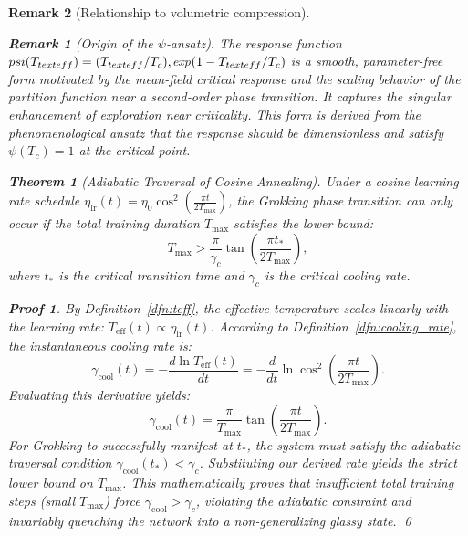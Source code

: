 \documentclass[11pt, a4paper]{article}
\newtheorem{theo}{Theorem}[section]
\theoremstyle{plain}
\newtheorem*{remark}{Remark}
\newtheorem*{pf}{Proof}
\begin{document}
\begin{remark}[Relationship to volumetric compression]
\begin{remark}[Origin of the $\psi$‑ansatz]
The response function $\\psi(T_{\\text{eff}}) = (T_{\\text{eff}}/T_c)\\,$exp$(1-T_{\\text{eff}}/T_c)$ is a smooth, parameter-free form motivated by the mean-field critical response and the scaling behavior of the partition function near a second‑order phase transition. It captures the singular enhancement of exploration near criticality. This form is derived from the phenomenological ansatz that the response should be dimensionless and satisfy $\psi(T_c) = 1$ at the critical point.
\end{remark}

\begin{theo}[Adiabatic Traversal of Cosine Annealing]\label{theo:cosine_annealing}
Under a cosine learning rate schedule $\eta_{\text{lr}}(t) = \eta_0 \cos^2\left(\frac{\pi t}{2 T_{\max}}\right)$, the Grokking phase transition can only occur if the total training duration $T_{\max}$ satisfies the lower bound:
\begin{equation}
T_{\max} > \frac{\pi}{\gamma_c} \tan\left(\frac{\pi t_*}{2 T_{\max}}\right),
\end{equation}
where $t_*$ is the critical transition time and $\gamma_c$ is the critical cooling rate.
\end{theo}

\begin{pf}
By Definition~\ref{dfn:teff}, the effective temperature scales linearly with the learning rate: $T_{\text{eff}}(t) \propto \eta_{\text{lr}}(t)$. According to Definition~\ref{dfn:cooling_rate}, the instantaneous cooling rate is:
\[
\gamma_{\text{cool}}(t) = -\frac{d \ln T_{\text{eff}}(t)}{dt} = -\frac{d}{dt} \ln \cos^2\left(\frac{\pi t}{2 T_{\max}}\right).
\]
Evaluating this derivative yields:
\[
\gamma_{\text{cool}}(t) = \frac{\pi}{T_{\max}} \tan\left(\frac{\pi t}{2 T_{\max}}\right).
\]
For Grokking to successfully manifest at $t_*$, the system must satisfy the adiabatic traversal condition $\gamma_{\text{cool}}(t_*) < \gamma_c$. Substituting our derived rate yields the strict lower bound on $T_{\max}$. This mathematically proves that insufficient total training steps (small $T_{\max}$) force $\gamma_{\text{cool}} > \gamma_c$, violating the adiabatic constraint and invariably quenching the network into a non-generalizing glassy state.
\qed
\end{pf}


\end{remark}
\end{document}

